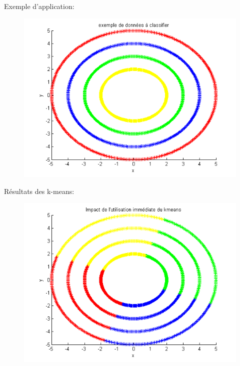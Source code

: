 \documentclass{beamer}
\begin{document}
\begin{frame}

Exemple d'application:

\begin{figure}
\centering
\includegraphics[scale=0.5,angle=0]{DataSet.png}
\label{fig:MA} 
\end{figure}

\end{frame}

\begin{frame}

Résultats des k-means:

\begin{figure}
\centering
\includegraphics[scale=0.5,angle=0]{AlgoKmeans.png}
\label{fig:MA} 
\end{figure}

\end{frame}
\end{document}
